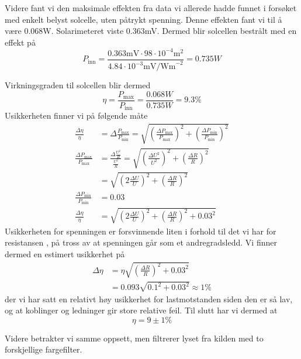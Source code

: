 \documentclass[a4paper,11pt, twocolumn]{article}
\begin{document}
Videre fant vi den maksimale effekten fra data vi allerede hadde funnet i forsøket med enkelt belyst solcelle, uten påtrykt spenning. Denne effekten fant vi til å være 0.068W. Solarimeteret viste 0.363mV. Dermed blir solcellen bestrålt med en effekt på
\begin{equation}
	P_\text{inn} = \frac{0.363\text{mV}\cdot98\cdot10^{-4}\text{m}^2}{4.84\cdot10^{-3}\text{mV/Wm}^{-2}} = 0.735W
\end{equation}

Virkningsgraden til solcellen blir dermed
\begin{equation}
	\eta = \frac{P_\text{max}}{P_\text{inn}} = \frac{0.068W}{0.735W} = 9.3\text{\%}
\end{equation}
Usikkerheten finner vi på følgende måte
\begin{align}
\frac{\Delta \eta}{\eta} &= \Delta\frac{P_\text{max}}{P_\text{min}} = \sqrt{\left(\frac{\Delta P_\text{max}}{P_\text{max}}\right)^2+\left(\frac{\Delta P_\text{min}}{P_\text{min}}\right)^2}\\
\frac{\Delta P_\text{max}}{P_\text{max}} &= \frac{\Delta\frac{U^2}{R}}{\frac{U^2}{R}} = \sqrt{\left(\frac{\Delta U^2}{U^2}\right)^2+\left(\frac{\Delta R}{R}\right)^2}\\
&= \sqrt{\left(2\frac{\Delta U}{U}\right)^2+\left(\frac{\Delta R}{R}\right)^2}\\
\frac{\Delta P_\text{min}}{P_\text{min}} &= 0.03\\
\frac{\Delta \eta}{\eta} &= \sqrt{{\left(2\frac{\Delta U}{U}\right)^2+\left(\frac{\Delta R}{R}\right)^2}+0.03^2}
\end{align}
Usikkerheten for spenningen er forsvinnende liten i forhold til det vi har for resistansen , på tross av at spenningen går som et andregradsledd. Vi finner dermed en estimert usikkerhet på
\begin{align}
	\Delta\eta &= \eta\sqrt{{\left(\frac{\Delta R}{R}\right)^2}+0.03^2}\\
	&= 0.093\sqrt{0.1^2+0.03^2} \approx 1\text{\%}
\end{align}
der vi har satt en relativt høy usikkerhet for lastmotstanden siden den er så lav, og at koblinger og ledninger gir store relative feil. 
Til slutt har vi dermed at 
\begin{equation}
	\eta = 9\pm1\text{\%}
\end{equation}

Videre betrakter vi samme oppsett, men filtrerer lyset fra kilden med to forskjellige fargefilter.
\end{document}

